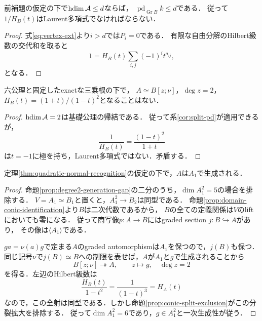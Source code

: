 \documentclass[11pt,a4paper]{ltjsarticle}
\begin{document}
\begin{corollary}[有限ホモロジー次元からの分裂境界の制約]\label{cor:split-pd}
前補題の仮定の下で$\operatorname{hdim}\mathcal A\leq d$ならば，
$\operatorname{pd}_{\operatorname{Gr}B}k\leq d$である．
従って$1/H_B(t)$はLaurent多項式でなければならない．
\end{corollary}
\begin{proof}
式\eqref{eq:vertex-ext}より$i>d$では$P_i=0$である．
有限な自由分解のHilbert級数の交代和を取ると
\[
 1=H_B(t)\sum_{i,j}(-1)^it^{a_{ij}},
\]
となる．
\end{proof}

\begin{proposition}\label{prop:conic-split-exclusion}
六公理と固定したexactな三乗根の下で，
$A\simeq B[z;\nu]$，$\deg z=2$，
$H_B(t)=(1+t)/(1-t)^2$となることはない．
\end{proposition}
\begin{proof}
$\operatorname{hdim}\mathcal A=2$は基礎公理の帰結である．
従って系\ref{cor:split-pd}が適用できるが，
\[
 \frac1{H_B(t)}=\frac{(1-t)^2}{1+t}
\]
は$t=-1$に極を持ち，Laurent多項式ではない．矛盾する．
\end{proof}



\begin{proposition}\label{prop:conic-degree-one-generation}
定理\ref{thm:quadratic-normal-recognition}の仮定の下で，$A$は$A_1$で生成される．
\end{proposition}
\begin{proof}
命題\ref{prop:degree2-generation-gap}の二分のうち，$\dim A_1^2=5$の場合を排除する．
$V=A_1\simeq B_1$と置くと，$A_1^2\to B_2$は同型である．
命題\ref{prop:domain-conic-identification}より$B$は二次代数であるから，
$B$の全ての定義関係は$V$のliftにおいても零になる．
従って商写像$p:A\to B$にはgraded section $j:B\hookrightarrow A$があり，
その像は$\langle A_1\rangle$である．

$ga=\nu(a)g$で定まる$A$のgraded automorphismは$A_1$を保つので，$j(B)$も保つ．
同じ記号$\nu$で$j(B)\simeq B$への制限を表せば，$A$が$A_1$と$g$で生成されることから
\[
 B[z;\nu]\twoheadrightarrow A,\qquad z\longmapsto g,\quad\deg z=2
\]
を得る．左辺のHilbert級数は
\[
 \frac{H_B(t)}{1-t^2}=\frac1{(1-t)^3}=H_A(t)
\]
なので，この全射は同型である．しかし命題\ref{prop:conic-split-exclusion}がこの分裂拡大を排除する．
従って$\dim A_1^2=6$であり，$g\in A_1^2$と一次生成性が従う．
\end{proof}
\end{document}

